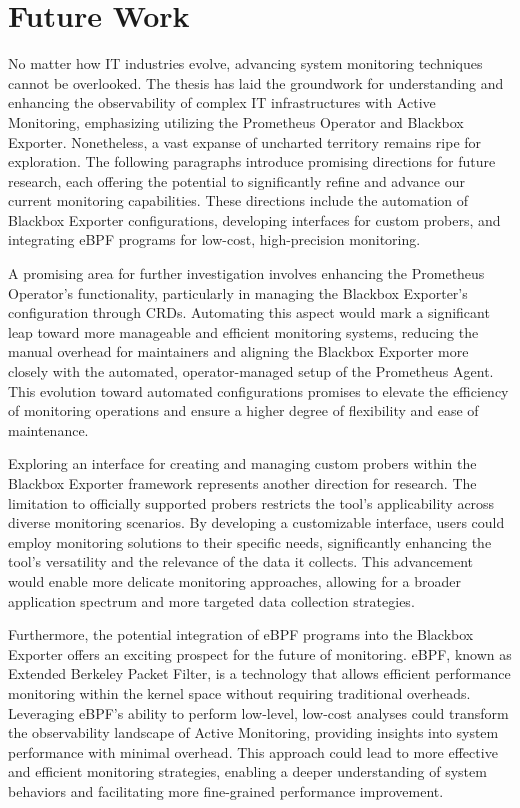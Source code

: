 
\chapter{Future Work}\label{chapter:future_work}

No matter how IT industries evolve, advancing system monitoring techniques cannot be overlooked. The thesis has laid the groundwork for understanding and enhancing the observability of complex IT infrastructures with Active Monitoring, emphasizing utilizing the Prometheus Operator and Blackbox Exporter. Nonetheless, a vast expanse of uncharted territory remains ripe for exploration. The following paragraphs introduce promising directions for future research, each offering the potential to significantly refine and advance our current monitoring capabilities. These directions include the automation of Blackbox Exporter configurations, developing interfaces for custom probers, and integrating eBPF programs for low-cost, high-precision monitoring. 

A promising area for further investigation involves enhancing the Prometheus Operator's functionality, particularly in managing the Blackbox Exporter's configuration through \ac{CRD}s. Automating this aspect would mark a significant leap toward more manageable and efficient monitoring systems, reducing the manual overhead for maintainers and aligning the Blackbox Exporter more closely with the automated, operator-managed setup of the Prometheus Agent. This evolution toward automated configurations promises to elevate the efficiency of monitoring operations and ensure a higher degree of flexibility and ease of maintenance. 

Exploring an interface for creating and managing custom probers within the Blackbox Exporter framework represents another direction for research. The limitation to officially supported probers restricts the tool's applicability across diverse monitoring scenarios. By developing a customizable interface, users could employ monitoring solutions to their specific needs, significantly enhancing the tool's versatility and the relevance of the data it collects. This advancement would enable more delicate monitoring approaches, allowing for a broader application spectrum and more targeted data collection strategies. 

Furthermore, the potential integration of eBPF programs into the Blackbox Exporter offers an exciting prospect for the future of monitoring. eBPF, known as Extended Berkeley Packet Filter, is a technology that allows efficient performance monitoring within the kernel space without requiring traditional overheads. Leveraging eBPF's ability to perform low-level, low-cost analyses could transform the observability landscape of Active Monitoring, providing insights into system performance with minimal overhead. This approach could lead to more effective and efficient monitoring strategies, enabling a deeper understanding of system behaviors and facilitating more fine-grained performance improvement. 

